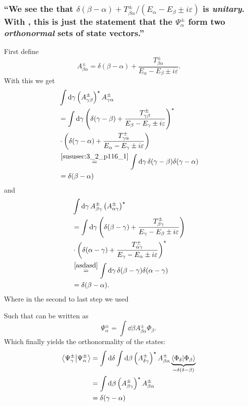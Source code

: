 \subsubsection{\enquote{We see the that $\delta(\beta-\alpha)+T_{\beta\alpha}^\pm/(E_\alpha-E_\beta\pm i \varepsilon)$ is \emph{unitary}. With , this is just the statement that the $\Psi_\alpha^\pm$ form two \emph{orthonormal} sets of state vectors.} }
First define \[A_{\beta\alpha}^\pm=\delta(\beta-\alpha)+\dfrac{T_{\beta\alpha}^\pm}{E_\alpha-E_\beta\pm i \varepsilon}.\]
With this we get
\begin{align*}
	&\int\dd{\gamma} \left(A_{\gamma\beta}^\pm\right)^\star A_{\gamma\alpha}^\pm\\
	&=\int\dd{\gamma}\left(\delta(\gamma-\beta)+\dfrac{T_{\gamma\beta}^\pm}{E_\beta-E_\gamma\pm i \varepsilon}\right)^\star\\
	&\cdot\left(\delta(\gamma-\alpha)+\dfrac{T_{\gamma\alpha}^\pm}{E_\alpha-E_\gamma\pm i \varepsilon}\right)\\
	&\overset{\ref{sususec:3_2_p116_1}}{=}\int\dd{\gamma}\delta(\gamma-\beta)\delta(\gamma-\alpha)\\
	&=\delta(\beta-\alpha)
\end{align*}
and
\begin{align*}
	&\int\dd{\gamma} A_{\beta\gamma}^\pm \left(A_{\alpha\gamma}^\pm\right)^\star\\
	&=\int\dd{\gamma}\left(\delta(\beta-\gamma)+\dfrac{T_{\beta\gamma}^\pm}{E_\gamma-E_\beta\pm i \varepsilon}\right)\\
	&\cdot\left(\delta(\alpha-\gamma)+\dfrac{T_{\alpha\gamma}^\pm}{E_\gamma-E_\alpha\pm i \varepsilon}\right)^\star\\
	&\overset{\ref{asdasd}}{=}\int\dd{\gamma}\delta(\beta-\gamma)\delta(\alpha-\gamma)\\
	&=\delta(\beta-\alpha).
\end{align*}
Where in the second to last step we used \todo


Such that  can be written as
\[\Psi_\alpha^\pm=\int\dd{\beta}A_{\beta\alpha}^\pm\Phi_\beta.\]
Which finally yields the orthonormality of the states:
\begin{align*}
	\innerproduct{\Psi_\gamma^\pm}{\Psi_\alpha^\pm}&=\int\dd{\delta}\int\dd{\beta} \left(A_{\delta\gamma}^\pm\right)^\star A_{\beta\alpha}^\pm\underbrace{\innerproduct{\Phi_\delta}{\Phi_\beta}}_{=\delta(\delta-\beta)}\\
	&=\int\dd{\beta} \left(A_{\beta\gamma}^\pm\right)^\star A_{\beta\alpha}^\pm\\
	&=\delta(\gamma-\alpha)
\end{align*}

